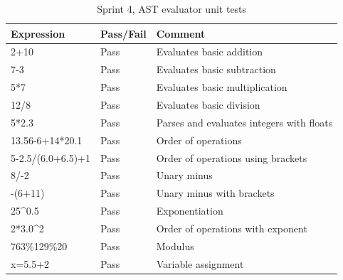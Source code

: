\documentclass[a4paper, oneside, 11pt]{report}
\begin{document}
\newpage

\begin{table}[h]
\caption{Sprint 4, AST evaluator unit tests}
\label{sprint4-ast-evaluator-test}
\begin{tabular}{|l|l|l|}
\hline
\textbf{Expression} & \textbf{Pass/Fail} & \textbf{Comment}                                                                     \\ \hline
2+10                & Pass               & Evaluates basic addition                                                             \\ \hline
7-3                 & Pass               & Evaluates basic subtraction                                                          \\ \hline
5*7                 & Pass               & Evaluates basic multiplication                                                       \\ \hline
12/8                & Pass               & Evaluates basic division                                                             \\ \hline
5*2.3               & Pass               & Parses and evaluates integers with floats                                            \\ \hline
13.56-6+14*20.1     & Pass               & Order of operations                                                                  \\ \hline
5-2.5/(6.0+6.5)+1   & Pass               & Order of operations using brackets                                                   \\ \hline
8/-2                & Pass               & Unary minus                                                                          \\ \hline
-(6+11)             & Pass               & Unary minus with brackets                                                            \\ \hline
25^0.5              & Pass               & Exponentiation                                                                       \\ \hline
2*3.0^2             & Pass               & Order of operations with exponent                                                    \\ \hline
763\%129\%20        & Pass               & Modulus                                                                              \\ \hline
x=5.5+2             & Pass               & Variable assignment                                                                  \\ \hline

\end{tabular}
\end{table}
\end{document}
